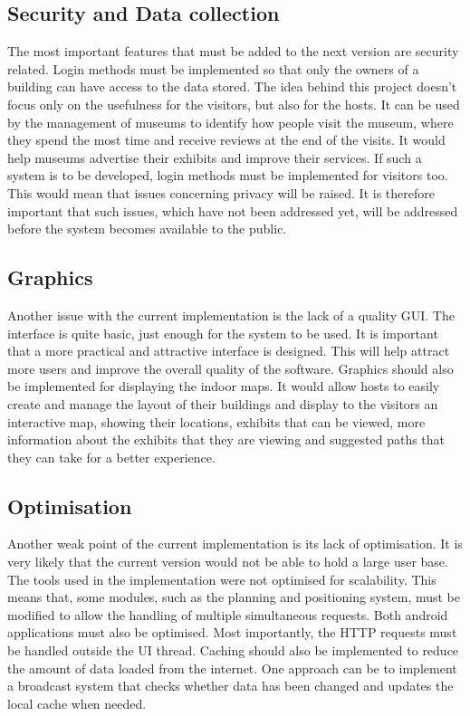 \subsection{Security and Data collection}
The most important features that must be added to the next version are security related. Login methods must be implemented so that only the owners of a building can have access to the data stored. The idea behind this project doesn’t focus only on the usefulness for the visitors, but also for the hosts. It can be used by the management of museums to identify how people visit the museum, where they spend the most time and receive reviews at the end of the visits. It would help museums advertise their exhibits and improve their services. If such a system is to be developed, login methods must be implemented for visitors too. This would mean that issues concerning privacy will be raised. It is therefore important that such issues, which have not been addressed yet, will be addressed before the system becomes available to the public. 

\subsection{Graphics}
Another issue with the current implementation is the lack of a quality GUI. The interface is quite basic, just enough for the system to be used. It is important that a more practical and attractive interface is designed. This will help attract more users and improve the overall quality of the software. Graphics should also be implemented for displaying the indoor maps. It would allow hosts to easily create and manage the layout of their buildings and display to the visitors an interactive map, showing their locations, exhibits that can be viewed, more information about the exhibits that they are viewing and suggested paths that they can take for a better experience. 

\subsection{Optimisation}
Another weak point of the current implementation is its lack of optimisation. It is very likely that the current version would not be able to hold a large user base. The tools used in the implementation were not optimised for scalability. This means that, some modules, such as the planning and positioning system, must be modified to allow the handling of multiple simultaneous requests. Both android applications must also be optimised. Most importantly, the HTTP requests must be handled outside the UI thread. Caching should also be implemented to reduce the amount of data loaded from the internet. One approach can be to implement a broadcast system that checks whether data has been changed and updates the local cache when needed.

